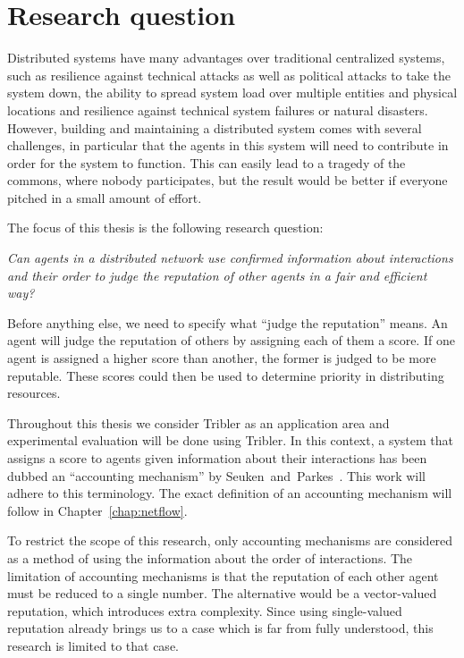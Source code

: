 \documentclass[a4paper,11pt]{book}
\theoremstyle{definition}
\begin{document}
\chapter{Research question}
\label{chap:research_questions}

Distributed systems have many advantages over traditional centralized
systems, such as resilience against technical attacks as well as political attacks to take the system down,
the ability to spread system load over multiple entities and physical locations and 
resilience against technical system failures or natural disasters.
 However, building and maintaining a distributed system comes with several challenges, in particular that
the agents in this system will need to contribute in order for the system to
function. This can easily lead to a tragedy of the commons, where nobody participates,
but the result would be better if everyone pitched in a small amount of effort.

The focus of this thesis is the following research question:
\begin{center}
    \emph{Can agents in a distributed network use confirmed information about
    interactions and their order to judge the reputation of other agents
    in a fair and efficient way?}
\end{center}

Before anything else, we need to specify what ``judge the reputation'' means.
An agent will judge the reputation of others by assigning each of them a score.
If one agent is assigned a higher score than another, the former is judged to be more
reputable.  These scores could then be used to determine priority in distributing resources.

Throughout this thesis we consider Tribler as an application area and experimental
evaluation will be done using Tribler. 
In this context, a system that assigns a score
to agents given information about their interactions has been dubbed an 
``accounting mechanism'' by Seuken~and~Parkes~\cite{seuken2010accounting}. This
work will adhere to this terminology. The exact definition of an accounting mechanism
will follow in Chapter~\ref{chap:netflow}. 

To restrict the scope of this research, only accounting mechanisms are considered as a method
of using the information about the order of interactions. The limitation of accounting mechanisms
is that the reputation of each other agent must be reduced to a single number. The alternative
would be a vector-valued reputation, which introduces extra complexity. Since using single-valued
reputation already brings us to a case which is far from fully understood, this research is limited
to that case.
\end{document}
